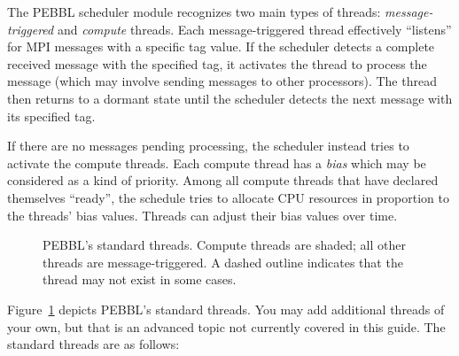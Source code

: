 The PEBBL scheduler module recognizes two main types of threads:
\emph{message-triggered} and \emph{compute} threads.  Each
message-triggered thread effectively ``listens'' for MPI messages with
a specific tag value.  If the scheduler detects a complete received
message with the specified tag, it activates the thread to process the
message (which may involve sending messages to other processors).  The
thread then returns to a dormant state until the scheduler detects the
next message with its specified tag.

If there are no messages pending processing, the scheduler instead
tries to activate the compute threads.  Each compute thread has a
\emph{bias} which may be considered as a kind of priority.  Among all
compute threads that have declared themselves ``ready'', the schedule
tries to allocate CPU resources in proportion to the threads'
bias values.  Threads can adjust their bias values over time.  

\begin{figure}[tbp]
\begin{center}
\vspace{-0.2in}
\end{center}
\caption{PEBBL's standard threads.  Compute threads are 
shaded; all other threads are message-triggered. A dashed outline
indicates that the thread may not exist in some cases.}
\label{fig:threads}
\end{figure}

Figure~\ref{fig:threads} depicts PEBBL's standard threads. You may add
additional threads of your own, but that is an advanced topic not
currently covered in this guide.  The standard threads are as follows:

